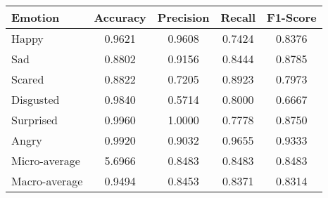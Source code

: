 \begin{tabular}{lcccc}
\toprule
Emotion & Accuracy & Precision & Recall & F1-Score \\
\midrule
Happy & 0.9621 & 0.9608 & 0.7424 & 0.8376 \\
Sad & 0.8802 & 0.9156 & 0.8444 & 0.8785 \\
Scared & 0.8822 & 0.7205 & 0.8923 & 0.7973 \\
Disgusted & 0.9840 & 0.5714 & 0.8000 & 0.6667 \\
Surprised & 0.9960 & 1.0000 & 0.7778 & 0.8750 \\
Angry & 0.9920 & 0.9032 & 0.9655 & 0.9333 \\
Micro-average & 5.6966 & 0.8483 & 0.8483 & 0.8483 \\
Macro-average & 0.9494 & 0.8453 & 0.8371 & 0.8314 \\
\bottomrule
\end{tabular}

